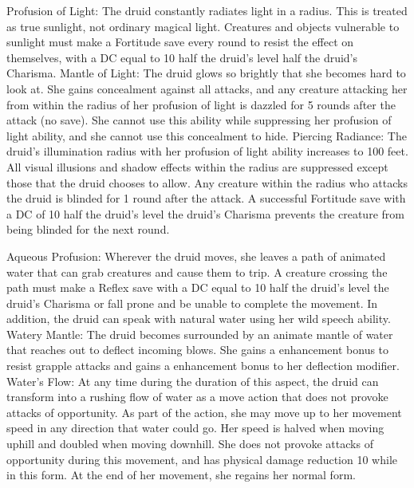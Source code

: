 \begin{greaterwildaspect}
\wilditem Profusion of Light: The druid constantly radiates light in a \arealarge radius. This is treated as true sunlight, not ordinary magical light. Creatures and objects vulnerable to sunlight must make a Fortitude save every round to resist the effect on themselves, with a DC equal to 10 \add half the druid's level \add half the druid's Charisma.
\wilditem Mantle of Light: The druid glows so brightly that she becomes hard to look at. She gains concealment against all attacks, and any creature attacking her from within the radius of her profusion of light is dazzled for 5 rounds after the attack (no save). She cannot use this ability while suppressing her profusion of light ability, and she cannot use this concealment to hide.
\wilditemplus Piercing Radiance: The druid's illumination radius with her profusion of light ability increases to 100 feet. All visual illusions and shadow effects within the radius are suppressed except those that the druid chooses to allow. Any creature within the radius who attacks the druid is blinded for 1 round after the attack. A successful Fortitude save with a DC of 10 \add half the druid's level \add the druid's Charisma prevents the creature from being blinded for the next round.
\end{greaterwildaspect}

\begin{greaterwildaspect}
\wilditem Aqueous Profusion: Wherever the druid moves, she leaves a path of animated water that can grab creatures and cause them to trip. A creature crossing the path must make a Reflex save with a DC equal to 10 \add half the druid's level \add the druid's Charisma or fall prone and be unable to complete the movement. In addition, the druid can speak with natural water using her wild speech ability.
\wilditem Watery Mantle: The druid becomes surrounded by an animate mantle of water that reaches out to deflect incoming blows. She gains a  enhancement bonus to resist grapple attacks and gains a  enhancement bonus to her deflection modifier.
\wilditemplus Water's Flow: At any time during the duration of this aspect, the druid can transform into a rushing flow of water as a move action that does not provoke attacks of opportunity. As part of the action, she may move up to her movement speed in any direction that water could go. Her speed is halved when moving uphill and doubled when moving downhill. She does not provoke attacks of opportunity during this movement, and has physical damage reduction 10 while in this form. At the end of her movement, she regains her normal form.
\end{greaterwildaspect}

